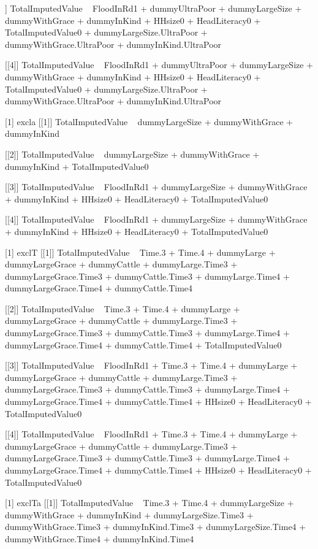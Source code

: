 \begin{Schunk}
\begin{Soutput}
[[3]]
TotalImputedValue ~ FloodInRd1 + dummyUltraPoor + dummyLargeSize + 
    dummyWithGrace + dummyInKind + HHsize0 + HeadLiteracy0 + 
    TotalImputedValue0 + dummyLargeSize.UltraPoor + dummyWithGrace.UltraPoor + 
    dummyInKind.UltraPoor

[[4]]
TotalImputedValue ~ FloodInRd1 + dummyUltraPoor + dummyLargeSize + 
    dummyWithGrace + dummyInKind + HHsize0 + HeadLiteracy0 + 
    TotalImputedValue0 + dummyLargeSize.UltraPoor + dummyWithGrace.UltraPoor + 
    dummyInKind.UltraPoor

[1] excla
[[1]]
TotalImputedValue ~ dummyLargeSize + dummyWithGrace + dummyInKind

[[2]]
TotalImputedValue ~ dummyLargeSize + dummyWithGrace + dummyInKind + 
    TotalImputedValue0

[[3]]
TotalImputedValue ~ FloodInRd1 + dummyLargeSize + dummyWithGrace + 
    dummyInKind + HHsize0 + HeadLiteracy0 + TotalImputedValue0

[[4]]
TotalImputedValue ~ FloodInRd1 + dummyLargeSize + dummyWithGrace + 
    dummyInKind + HHsize0 + HeadLiteracy0 + TotalImputedValue0

[1] exclT
[[1]]
TotalImputedValue ~ Time.3 + Time.4 + dummyLarge + dummyLargeGrace + 
    dummyCattle + dummyLarge.Time3 + dummyLargeGrace.Time3 + 
    dummyCattle.Time3 + dummyLarge.Time4 + dummyLargeGrace.Time4 + 
    dummyCattle.Time4

[[2]]
TotalImputedValue ~ Time.3 + Time.4 + dummyLarge + dummyLargeGrace + 
    dummyCattle + dummyLarge.Time3 + dummyLargeGrace.Time3 + 
    dummyCattle.Time3 + dummyLarge.Time4 + dummyLargeGrace.Time4 + 
    dummyCattle.Time4 + TotalImputedValue0

[[3]]
TotalImputedValue ~ FloodInRd1 + Time.3 + Time.4 + dummyLarge + 
    dummyLargeGrace + dummyCattle + dummyLarge.Time3 + dummyLargeGrace.Time3 + 
    dummyCattle.Time3 + dummyLarge.Time4 + dummyLargeGrace.Time4 + 
    dummyCattle.Time4 + HHsize0 + HeadLiteracy0 + TotalImputedValue0

[[4]]
TotalImputedValue ~ FloodInRd1 + Time.3 + Time.4 + dummyLarge + 
    dummyLargeGrace + dummyCattle + dummyLarge.Time3 + dummyLargeGrace.Time3 + 
    dummyCattle.Time3 + dummyLarge.Time4 + dummyLargeGrace.Time4 + 
    dummyCattle.Time4 + HHsize0 + HeadLiteracy0 + TotalImputedValue0

[1] exclTa
[[1]]
TotalImputedValue ~ Time.3 + Time.4 + dummyLargeSize + dummyWithGrace + 
    dummyInKind + dummyLargeSize.Time3 + dummyWithGrace.Time3 + 
    dummyInKind.Time3 + dummyLargeSize.Time4 + dummyWithGrace.Time4 + 
    dummyInKind.Time4


\end{Soutput}
\end{Schunk}
